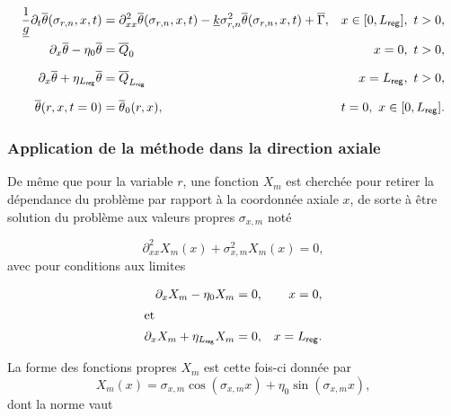 \begin{subequations}
	\begin{align}
		\frac{1}{\underline g} \partial_t \overline \theta(\sigma_{r,n},x,t) &= \partial_{xx}^{2} \overline \theta(\sigma_{r,n},x,t) - \underline k \sigma_{r,n}^2 \overline \theta(\sigma_{r,n},x,t) + \overline \Gamma, & x \in [0,L_{\sf reg}],\ t>0, \label{eq:TransfoInteg_BilanThermique_R} \\
		\partial_x \overline \theta - \eta_0 \overline \theta &= \overline Q_0 & x=0,\ t>0, \label{eq:TransfoInteg_CondFront_x_0Froid_R} \\[6pt]
		\partial_x \overline \theta + \eta_{L_{\sf reg}} \overline \theta &= \overline Q_{L_{\sf reg}} & x=L_{\sf reg},\ t>0, \label{eq:TransfoInteg_CondFront_x_LregAmb_R} \\[6pt]
		\overline \theta(r,x,t=0) &= \overline \theta_0(r,x), & t=0,\ x \in [0,L_{\sf reg}]. \label{eq:TransfoInteg_CondInit_R}
	\end{align}
\end{subequations}

\subsubsection{Application de la méthode dans la direction axiale}
De même que pour la variable $r$, une fonction $X_m$ est cherchée pour retirer la dépendance du problème par rapport à la coordonnée axiale $x$, de sorte à être solution du problème aux valeurs propres $\sigma_{x,m}$ noté

\begin{equation}
	\partial_{xx}^2 X_m(x) + \sigma_{x,m}^2 X_m(x) = 0,
	\label{eq:TransfoInteg_ProbValPropre_X}
\end{equation}
avec pour conditions aux limites

\begin{subequations}
	\begin{align}
		\partial_x X_m - \eta_0 X_m &= 0, & x=0, \label{eq:TransfoInteg_CondFront_X0} \\ \intertext{et}
		\partial_x X_m + \eta_{L_{\sf reg}} X_m &= 0, & x=L_{\sf reg}. \label{eq:TransfoInteg_CondFront_XLreg}
	\end{align}
\end{subequations}

La forme des fonctions propres $X_m$ est cette fois-ci donnée par 
\begin{equation}
	X_m(x) = \sigma_{x,m} \cos(\sigma_{x,m} x) + \eta_0 \sin(\sigma_{x,m} x),
\end{equation}
dont la norme vaut

